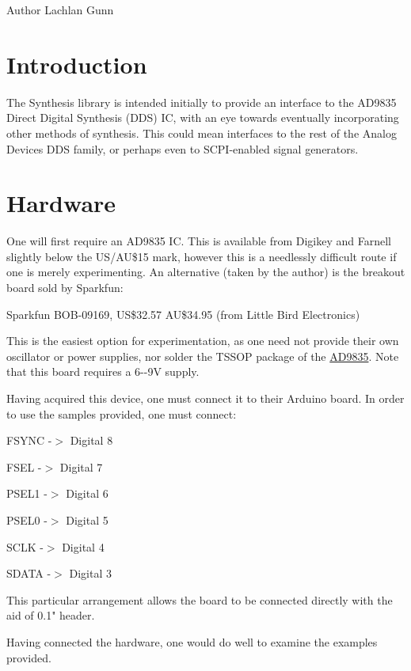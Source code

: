 \begin{DoxyAuthor}{Author}
Lachlan Gunn
\end{DoxyAuthor}
\hypertarget{index_Introduction}{}\section{Introduction}\label{index_Introduction}
The Synthesis library is intended initially to provide an interface to the AD9835 Direct Digital Synthesis (DDS) IC, with an eye towards eventually incorporating other methods of synthesis. This could mean interfaces to the rest of the Analog Devices DDS family, or perhaps even to SCPI-\/enabled signal generators.\hypertarget{index_Hardware}{}\section{Hardware}\label{index_Hardware}
One will first require an AD9835 IC. This is available from Digikey and Farnell slightly below the US/AU\$15 mark, however this is a needlessly difficult route if one is merely experimenting. An alternative (taken by the author) is the breakout board sold by Sparkfun:


\begin{DoxyItemize}
\item Sparkfun BOB-\/09169, US\$32.57 AU\$34.95 (from Little Bird Electronics)
\end{DoxyItemize}

This is the easiest option for experimentation, as one need not provide their own oscillator or power supplies, nor solder the TSSOP package of the \hyperlink{class_a_d9835}{AD9835}. Note that this board requires a 6-\/-\/9V supply.

Having acquired this device, one must connect it to their Arduino board. In order to use the samples provided, one must connect:


\begin{DoxyItemize}
\item FSYNC -\/$>$ Digital 8
\item FSEL -\/$>$ Digital 7
\item PSEL1 -\/$>$ Digital 6
\item PSEL0 -\/$>$ Digital 5
\item SCLK -\/$>$ Digital 4
\item SDATA -\/$>$ Digital 3
\end{DoxyItemize}

This particular arrangement allows the board to be connected directly with the aid of 0.1" header.

Having connected the hardware, one would do well to examine the examples provided. 